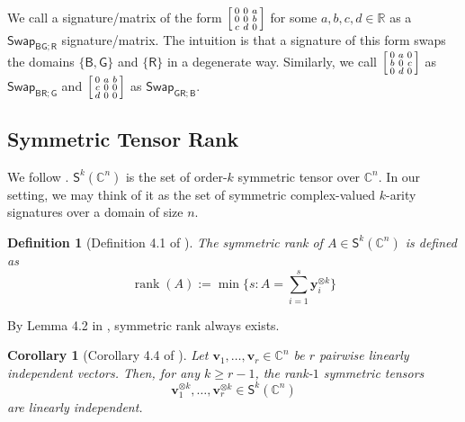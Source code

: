 \documentclass[11pt]{article}
\newtheorem{corollary}[theorem]{Corollary}
\newtheorem{definition}[theorem]{Definition}
\DeclareMathOperator{\rank}{rank}
\newcommand{\db}{\mathsf{B}}
\newcommand{\dg}{\mathsf{G}}
\newcommand{\dr}{\mathsf{R}}
\newcommand{\swhelper}[1]{$\mathsf{Swap}_{#1}$\xspace}
\newcommand{\swbg}{\swhelper{\db \dg; \dr}}
\newcommand{\swbr}{\swhelper{\db \dr; \dg}}
\newcommand{\swgr}{\swhelper{\dg \dr; \db}}
\begin{document}
We call a signature/matrix of the form $\begin{bsmallmatrix}
  0 & 0 & a \\
  0 & 0 & b \\
  c & d & 0
\end{bsmallmatrix}$ for some $a, b, c, d \in \mathbb{R}$ as a \swbg signature/matrix.
The intuition is that a signature of this form swaps the domains $\{\db, \dg\}$ and $\{\dr\}$ in a degenerate way.
Similarly, we call $\begin{bsmallmatrix}
  0 & a & 0 \\
  b & 0 & c \\
  0 & d & 0
\end{bsmallmatrix}$ as \swbr and $\begin{bsmallmatrix}
  0 & a & b \\
  c & 0 & 0 \\
  d & 0 & 0
\end{bsmallmatrix}$ as \swgr.

\subsection{Symmetric Tensor Rank}
We follow \cite{comon_symmetric_2008}.
$\mathsf{S}^k(\mathbb{C}^n)$ is the set of order-$k$ symmetric tensor over $\mathbb{C}^n$.
In our setting, we may think of it as the set of symmetric complex-valued $k$-arity signatures over a domain of size $n$.
\begin{definition}[Definition 4.1 of \cite{comon_symmetric_2008}]
  The symmetric rank of $A \in \mathsf{S}^k(\mathbb{C}^n)$ is defined as 
  \[
    \rank(A) := \min \{s : A = \sum_{i = 1}^s \mathbf{y}_i^{\otimes k}\}
  \]
\end{definition}
By Lemma 4.2 in \cite{comon_symmetric_2008}, symmetric rank always exists.


\begin{corollary}[Corollary 4.4 of \cite{comon_symmetric_2008}]\label{cor:pairiwse-linearly-independent-tensor}
  Let $\mathbf{v}_1, \ldots, \mathbf{v}_r \in \mathbb{C}^n$ be $r$ pairwise linearly independent vectors.
  Then, for any $k \ge r - 1$, the rank-$1$ symmetric tensors
  \[
    \mathbf{v}_1^{\otimes k}, \ldots, \mathbf{v}_r^{\otimes k} \in \mathsf{S}^k(\mathbb{C}^n)
  \]
  are linearly independent.
\end{corollary}
\end{document}
